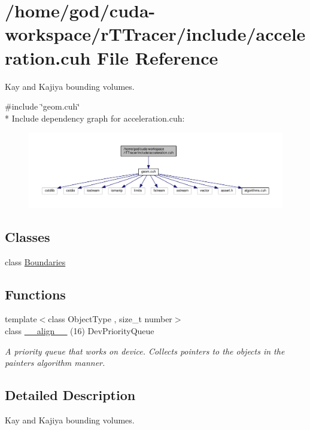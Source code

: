 \hypertarget{acceleration_8cuh}{}\section{/home/god/cuda-\/workspace/r\+T\+Tracer/include/acceleration.cuh File Reference}
\label{acceleration_8cuh}


Kay and Kajiya bounding volumes.  


{\ttfamily \#include \char`\"{}geom.\+cuh\char`\"{}}\\*
Include dependency graph for acceleration.\+cuh\+:
\nopagebreak
\begin{figure}[H]
\begin{center}
\leavevmode
\includegraphics[width=350pt]{acceleration_8cuh__incl}
\end{center}
\end{figure}
\subsection*{Classes}
\begin{DoxyCompactItemize}
\item 
class \hyperlink{class_boundaries}{Boundaries}
\end{DoxyCompactItemize}
\subsection*{Functions}
\begin{DoxyCompactItemize}
\item 
{\footnotesize template$<$class Object\+Type , size\+\_\+t number$>$ }\\class \hyperlink{acceleration_8cuh_a070af818501609893fa3557d5f97d5bb}{\+\_\+\+\_\+align\+\_\+\+\_\+} (16) Dev\+Priority\+Queue\hypertarget{acceleration_8cuh_a070af818501609893fa3557d5f97d5bb}{}\label{acceleration_8cuh_a070af818501609893fa3557d5f97d5bb}

\begin{DoxyCompactList}\small\item\em A priority queue that works on device. Collects pointers to the objects in the painter\textquotesingle{}s algorithm manner. \end{DoxyCompactList}\end{DoxyCompactItemize}


\subsection{Detailed Description}
Kay and Kajiya bounding volumes. 

